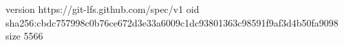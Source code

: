 version https://git-lfs.github.com/spec/v1
oid sha256:cbdc757998c0b76ce672d3e33a6009c1dc93801363c98591f9af3d4b50fa9098
size 5566
